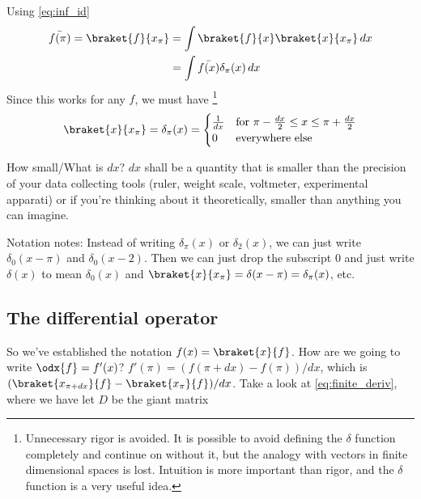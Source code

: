 \documentclass[12pt, oneside, letterpaper, fleqn]{article}
\begin{document}
Using \eqref{eq:inf_id}
\begin{align*}
\bar{f(\pi)} = \braket{f}{x_\pi} &= \int
\braket{f}{x}\braket{x}{x_\pi}\,dx\\
&= \int \bar{f(x)} \delta_\pi(x)\,dx
\end{align*}
Since this works for any $f$, we must have
\footnote{Unnecessary rigor is avoided. It is possible to avoid
defining the $\delta$ function completely and continue on without it,
but the analogy with vectors in finite dimensional spaces is lost.
Intuition is more important than rigor, and the $\delta$ function is
a very useful idea.}
\begin{align*}
\braket{x}{x_\pi} = \delta_\pi(x) = \begin{cases}
\frac{1}{dx} & \text{for } \pi-\frac{dx}{2} \leq x \leq
\pi+\frac{dx}{2}\\
0 & \text{everywhere else}
\end{cases}
\end{align*}

How small/What is $dx$? $dx$ shall be a quantity that is smaller than the
precision of your data collecting tools (ruler, weight scale,
voltmeter, experimental apparati) or if you're thinking about it
theoretically, smaller than anything you can imagine.

Notation notes: Instead of writing $\delta_\pi(x)$ or $\delta_2(x)$, we
can just write $\delta_0(x-\pi)$ and $\delta_0(x-2)$. Then we can just
drop the subscript $0$ and just write $\delta(x)$ to mean $\delta_0(x)$
and $\braket{x}{x_\pi} = \delta(x-\pi) = \delta_\pi(x)$, etc.


\subsection{The differential operator}
So we've established the notation $f(x) = \braket{x}{f}$. How are we
going to write $\odx{f} = f'(x)$? $f'(\pi) = (f(\pi+dx) - f(\pi))/dx$,
which is $(\braket{x_{\pi+dx}}{f} - \braket{x_\pi}{f})/dx$. Take a look
at \eqref{eq:finite_deriv}, where we have let $D$ be the giant matrix
\end{document}
